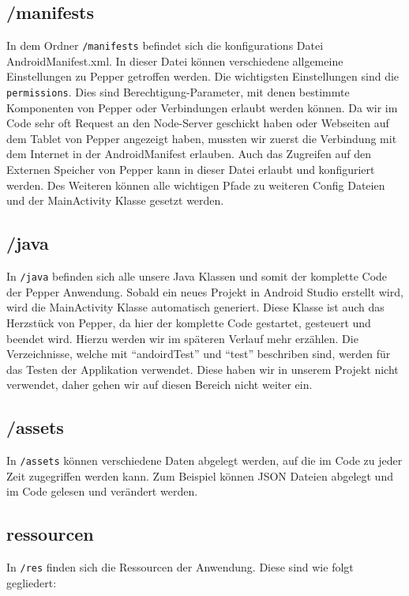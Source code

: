 \subsection*{/manifests}
In dem Ordner \verb|/manifests| befindet sich die konfigurations Datei AndroidManifest.xml. In dieser Datei können verschiedene allgemeine Einstellungen zu Pepper getroffen werden. Die wichtigsten Einstellungen sind die \verb|permissions|. Dies sind Berechtigung-Parameter, mit denen bestimmte Komponenten von Pepper oder Verbindungen erlaubt werden können. Da wir im Code sehr oft Request an den Node-Server geschickt haben oder Webseiten auf dem Tablet von Pepper angezeigt haben, mussten wir zuerst die Verbindung mit dem Internet in der AndroidManifest erlauben. Auch das Zugreifen auf den Externen Speicher von Pepper kann in dieser Datei erlaubt und konfiguriert werden. Des Weiteren können alle wichtigen Pfade zu weiteren Config Dateien und der MainActivity Klasse gesetzt werden.\\

\subsection*{/java}
In  \verb|/java| befinden sich alle unsere Java Klassen und somit der komplette Code der Pepper Anwendung. Sobald ein neues Projekt in Android Studio erstellt wird, wird die MainActivity Klasse automatisch generiert. Diese Klasse ist auch das Herzstück von Pepper, da hier der komplette Code gestartet, gesteuert und beendet wird. Hierzu werden wir im späteren Verlauf mehr erzählen. Die Verzeichnisse, welche mit ``andoirdTest'' und ``test'' beschriben sind, werden für das Testen der Applikation verwendet. Diese haben wir in unserem Projekt nicht verwendet, daher gehen wir auf diesen Bereich nicht weiter ein.\\

\subsection*{/assets}
In \verb|/assets| können verschiedene Daten abgelegt werden, auf die im Code zu jeder Zeit zugegriffen werden kann. Zum Beispiel können JSON Dateien abgelegt und im Code gelesen und verändert werden.\\

\subsection*{ressourcen}
In \verb|/res| finden sich die Ressourcen der Anwendung. Diese sind wie folgt gegliedert:\\

